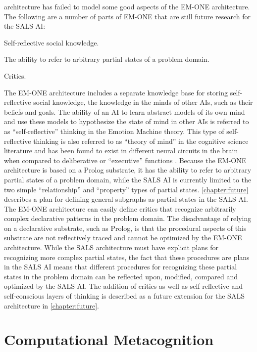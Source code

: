 architecture has failed to model some good aspects of the EM-ONE
architecture.  The following are a number of parts of EM-ONE that are
still future research for the SALS AI:
\begin{packed_enumerate}
\item{Self-reflective social knowledge.}
\item{The ability to refer to arbitrary partial states of a problem
  domain.}
\item{Critics.}
\end{packed_enumerate}
The EM-ONE architecture includes a separate knowledge base for storing
self-reflective social knowledge, the knowledge in the minds of other
AIs, such as their beliefs and goals.  The ability of an AI to learn
abstract models of its own mind and use these models to hypothesize
the state of mind in other AIs is referred to as ``self-reflective''
thinking in the Emotion Machine theory.  This type of self-reflective
thinking is also referred to as ``theory of mind'' in the cognitive
science literature and has been found to exist in different neural
circuits in the brain when compared to deliberative or ``executive''
functions \cite[]{saxe:2006}.  Because the EM-ONE architecture is
based on a Prolog substrate, it has the ability to refer to arbitrary
partial states of a problem domain, while the SALS AI is currently
limited to the two simple ``relationship'' and ``property'' types of
partial states.  {\mbox{\autoref{chapter:future}}} describes a plan
for defining general subgraphs as partial states in the SALS AI.  The
EM-ONE architecture can easily define critics that recognize
arbitrarily complex declarative patterns in the problem domain.  The
disadvantage of relying on a declarative substrate, such as Prolog, is
that the procedural aspects of this substrate are not reflectively
traced and cannot be optimized by the EM-ONE architecture.  While the
SALS architecture must have explicit plans for recognizing more
complex partial states, the fact that these procedures are plans in
the SALS AI means that different procedures for recognizing these
partial states in the problem domain can be reflected upon, modified,
compared and optimized by the SALS AI.  The addition of critics as
well as self-reflective and self-conscious layers of thinking is
described as a future extension for the SALS architecture in
{\mbox{\autoref{chapter:future}}}.

\section{Computational Metacognition}

